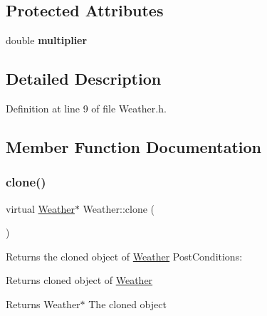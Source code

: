 \subsection*{Protected Attributes}
\begin{DoxyCompactItemize}
\item 
\mbox{\label{classWeather_aabbe8f1b3e93e9b4e9f28060dec9113b}} 
double {\bfseries multiplier}
\end{DoxyCompactItemize}


\subsection{Detailed Description}


Definition at line 9 of file Weather.\+h.



\subsection{Member Function Documentation}
\mbox{\label{classWeather_a7d902c27129b9191f72be837dd66fa83}} 
\subsubsection{\texorpdfstring{clone()}{clone()}}
{\footnotesize\ttfamily virtual \hyperlink{classWeather}{Weather}$\ast$ Weather\+::clone (\begin{DoxyParamCaption}{ }\end{DoxyParamCaption})\hspace{0.3cm}{\ttfamily [pure virtual]}}



Returns the cloned object of \hyperlink{classWeather}{Weather} Post\+Conditions\+: 


\begin{DoxyItemize}
\item Returns cloned object of \hyperlink{classWeather}{Weather}
\end{DoxyItemize}

\begin{DoxyReturn}{Returns}
Weather$\ast$ The cloned object 
\end{DoxyReturn}
\mbox{\label{classWeather_a608d4dbf5437b576d131fe92bf8b81d7}} 
